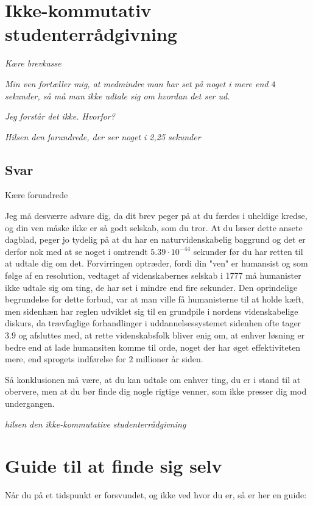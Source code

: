 \begin{minipage}[t]{170mm}
\vspace{3mm}
\section{Ikke-kommutativ studenterrådgivning}
\emph{Kære brevkasse}

\emph{Min ven fortæller mig, at medmindre man har set på noget i mere end $4$ sekunder, så må man ikke udtale sig om hvordan det ser ud.}

\emph{Jeg forstår det ikke. Hvorfor?}

\emph{Hilsen den forundrede, der ser noget i 2,25 sekunder}

\subsection*{Svar}
Kære forundrede

Jeg må desværre advare dig, da dit brev peger på at du færdes i uheldige kredse, og din ven måske ikke er så godt selskab, som du tror. At du læser dette ansete dagblad, peger jo tydelig på at du har en naturvidenskabelig baggrund og det er derfor nok med at se noget i omtrendt $5.39 \cdot 10^{-44}$ sekunder før du har retten til at udtale dig om det. Forvirringen optræder, fordi din "ven" er humansist og som følge af en resolution, vedtaget af videnskabernes selskab i 1777 må humanister ikke udtale sig om ting, de har set i mindre end fire sekunder. Den oprindelige begrundelse for dette forbud, var at man ville få humanisterne til at holde kæft, men sidenhæn har reglen udviklet sig til en grundpile i nordens videnskabelige diskurs, da trævfaglige forhandlinger i uddannelsessystemet sidenhen ofte tager $3.9$ og afsluttes med, at rette videnskabsfolk bliver enig om, at enhver løsning er bedre end at lade humansiten komme til orde, noget der har øget effektiviteten mere, end sprogets indførelse for $2$ millioner år siden. 

Så konklusionen må være, at du kan udtale om enhver ting, du er i stand til at obervere, men at du bør finde dig nogle rigtige venner, som ikke presser dig mod undergangen.

{\flushright\emph{hilsen den ikke-kommutative studenterrådgivning}}


\vspace{3mm}
\section*{Guide til at finde sig selv}
Når du på et tidspunkt er forsvundet, og ikke ved hvor du er, så er her en guide:


\end{minipage}
